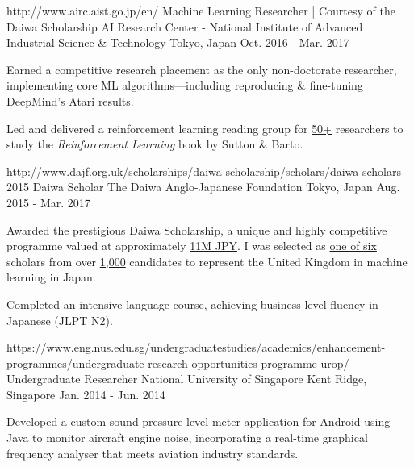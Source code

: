 \begin{cventries}
  \cventry
    {http://www.airc.aist.go.jp/en/}
    {Machine Learning Researcher | Courtesy of the Daiwa Scholarship} %
    {AI Research Center - National Institute of Advanced Industrial Science \& Technology} %
    {Tokyo, Japan} %
    {Oct. 2016 - Mar. 2017} %
    {
      \begin{cvitems} %
        \item {Earned a competitive research placement as the only non-doctorate researcher, implementing core ML algorithms—including reproducing \& fine-tuning DeepMind's Atari results.}
        \item {Led and delivered a reinforcement learning reading group for \underline{50+} researchers to study the \textit{Reinforcement Learning} book by Sutton \& Barto.}
      \end{cvitems}
    }

  \cventry
    {http://www.dajf.org.uk/scholarships/daiwa-scholarship/scholars/daiwa-scholars-2015}
    {Daiwa Scholar} %
    {The Daiwa Anglo-Japanese Foundation} %
    {Tokyo, Japan} %
    {Aug. 2015 - Mar. 2017} %
    {
      \begin{cvitems} %
        \item {Awarded the prestigious Daiwa Scholarship, a unique and highly competitive programme valued at approximately \underline{11M JPY}. I was selected as \underline{one of six} scholars from over \underline{1,000} candidates to represent the United Kingdom in machine learning in Japan.}
        \item {Completed an intensive language course, achieving business level fluency in Japanese (JLPT N2).}
      \end{cvitems}
    }

  \cventry
    {https://www.eng.nus.edu.sg/undergraduatestudies/academics/enhancement-programmes/undergraduate-research-opportunities-programme-urop/}
    {Undergraduate Researcher} %
    {National University of Singapore} %
    {Kent Ridge, Singapore} %
    {Jan. 2014 - Jun. 2014} %
    {
      \begin{cvitems} %
        \item {Developed a custom sound pressure level meter application for Android using Java to monitor aircraft engine noise, incorporating a real-time graphical frequency analyser that meets aviation industry standards.}
      \end{cvitems}
    }


\end{cventries}
